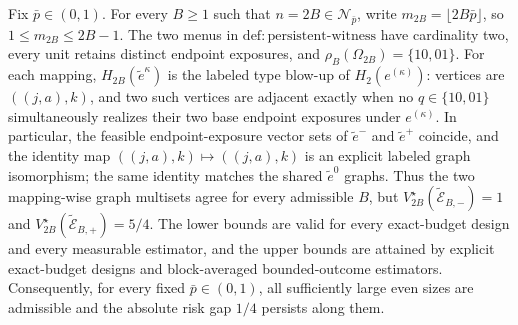 Fix \(\bar p\in(0,1)\). For every \(B\ge1\) such that \(n=2B\in\mathcal N_{\bar p}\), write \(m_{2B}=\lfloor 2B\bar p\rfloor\), so \(1\le m_{2B}\le2B-1\). The two menus in \(\mathrm{def{:}persistent\text{-}witness}\) have cardinality two, every unit retains distinct endpoint exposures, and \(\rho_B(\Omega_{2B})=\{10,01\}\). For each mapping, \(H_{2B}(\widetilde e^\kappa)\) is the labeled type blow-up of \(H_2(e^{(\kappa)})\): vertices are \(((j,a),k)\), and two such vertices are adjacent exactly when no \(q\in\{10,01\}\) simultaneously realizes their two base endpoint exposures under \(e^{(\kappa)}\). In particular, the feasible endpoint-exposure vector sets of \(\widetilde e^-\) and \(\widetilde e^+\) coincide, and the identity map \(((j,a),k)\mapsto((j,a),k)\) is an explicit labeled graph isomorphism; the same identity matches the shared \(\widetilde e^0\) graphs. Thus the two mapping-wise graph multisets agree for every admissible \(B\), but \(V_{2B}^\star(\widetilde{\mathcal E}_{B,-})=1\) and \(V_{2B}^\star(\widetilde{\mathcal E}_{B,+})=5/4\). The lower bounds are valid for every exact-budget design and every measurable estimator, and the upper bounds are attained by explicit exact-budget designs and block-averaged bounded-outcome estimators. Consequently, for every fixed \(\bar p\in(0,1)\), all sufficiently large even sizes are admissible and the absolute risk gap \(1/4\) persists along them.